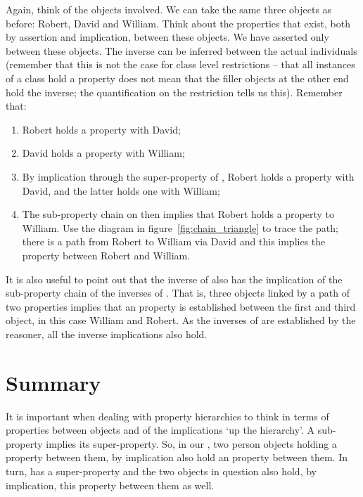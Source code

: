 Again, think of the objects involved. We can take the same three objects as before: Robert, David and William. Think about the properties that exist, both by assertion and implication, between these objects. We have asserted only  between these objects. The inverse can be inferred between the actual individuals (remember that this is not the case for class level restrictions -- that all instances of a class hold a property does not mean that the filler objects at the other end hold the inverse; the quantification on the restriction tells us this). Remember that:
\begin{enumerate}
\item Robert holds a  property with David;
\item David holds a  property with William;
\item By implication through the  super-property of , Robert holds a  property with David, and the latter holds one with William;
\item The sub-property chain on  then implies that Robert holds a  property to William. Use the diagram in figure~\ref{fig:chain_triangle} to trace the path; there is a  path from Robert to William via David and this implies the  property between Robert and William.
\end{enumerate}

It is also useful to point out that the inverse of  also has the implication of the sub-property chain of the inverses of . That is, three objects linked by a path of two  properties implies that an  property is established between the first and third object, in this case William and Robert. As the inverses of  are established by the reasoner, all the inverse implications also hold.

\section{Summary}

It is important when dealing with property hierarchies to think in terms of properties between objects and of the implications `up the hierarchy'. A sub-property implies its super-property. So, in our \fhkb, two person objects holding a  property between them, by implication also hold an  property between them. In turn,  has a super-property  and the two objects in question also hold, by implication, this property between them as well.


